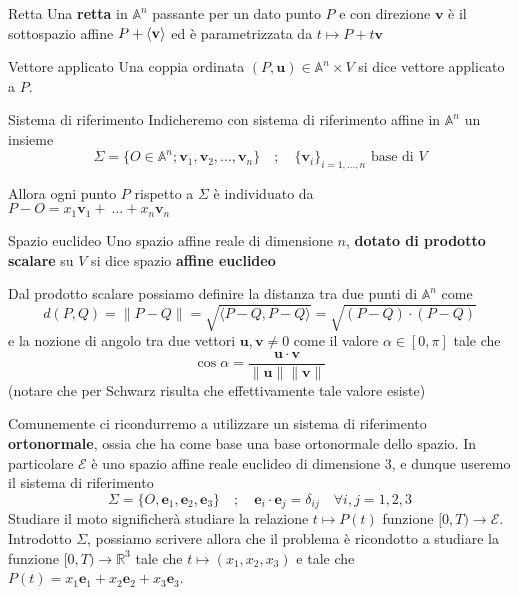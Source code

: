 \begin{definition}{Retta}
    Una \textbf{retta} in \(\mathbb{A}^{n}\) passante per un dato punto \(P\) e
    con direzione \(\mathbf{v} \) è il sottospazio affine \(P + {\left\langle\mathbf{v} \right\rangle} \) ed è
    parametrizzata da \(t \mapsto P + t \mathbf{v} \) 
\end{definition}

\begin{definition}{Vettore applicato}
    Una coppia ordinata \({(P, \mathbf{u} )} \in \mathbb{A}^{n} \times V\) si dice vettore
    applicato a \(P\).
\end{definition}

\begin{definition}{Sistema di riferimento}
    Indicheremo con sistema di riferimento affine in \(\mathbb{A}^{n}\) un
    insieme 
    \[
      \Sigma = \{O \in \mathbb{A}^{n} ; \mathbf{v} _{1}, \mathbf{v} _{2}, \dots,
      \mathbf{v} _{n}\} \quad ;
      \quad {\{\mathbf{v} _{i}\}}_{i = 1, \dots, n} \text{ base di } V
    \]
\end{definition}
\begin{remark}
    Allora ogni punto \(P\) rispetto a \(\Sigma\) è individuato da \\\(P - O =
    x_{1}\mathbf{v} _{1} +~\dots + x_{n}\mathbf{v} _{n}\) 
\end{remark}

\begin{definition}{Spazio euclideo}
    Uno spazio affine reale di dimensione \(n\), \textbf{dotato di prodotto
    scalare} su \(V\) si dice spazio \textbf{affine euclideo}
\end{definition}

Dal prodotto scalare possiamo definire la distanza tra due punti di
\(\mathbb{A}^{n}\) come
\[
d(P, Q) = \|P - Q\| = \sqrt{\langle P - Q, P - Q \rangle} = \sqrt{{(P -
    Q)} \cdot {(P - Q)}}
\]
e la nozione di angolo tra due vettori \(\mathbf{u} , \mathbf{v}  \neq 0\) come il valore \(\alpha
\in [0, \pi]\) tale che
\[
  \cos \alpha = \frac{\mathbf{u}  \cdot \mathbf{v} }{\|\mathbf{u} \| \|\mathbf{v} \|}
\]
(notare che per Schwarz risulta che effettivamente tale valore esiste)

Comunemente ci ricondurremo a utilizzare un sistema di riferimento
\textbf{ortonormale}, ossia che ha come base una base ortonormale dello spazio.
In particolare \(\mathcal{E}\) è uno spazio affine reale euclideo di dimensione
3, e dunque useremo il sistema di riferimento
\[
    \Sigma = \{O, \mathbf{e} _{1}, \mathbf{e} _{2}, \mathbf{e} _{3}\} \quad ; \quad \mathbf{e} _{i} \cdot \mathbf{e} _{j} =
    \delta_{ij} \quad \forall i, j = 1, 2, 3
\]
Studiare il moto significherà studiare la relazione \(t \mapsto P(t)\) funzione
\([0, T) \to \mathcal{E}\). Introdotto \(\Sigma\), possiamo scrivere allora che
il problema è ricondotto a studiare la funzione \([0, T) \to \mathbb{R}^{3}\)
tale che \(t \mapsto (x_{1}, x_{2}, x_{3})\) e tale che \(P(t) = x_{1} \mathbf{e} _{1} +
x_{2} \mathbf{e} _{2} + x_{3} \mathbf{e} _{3}\).

